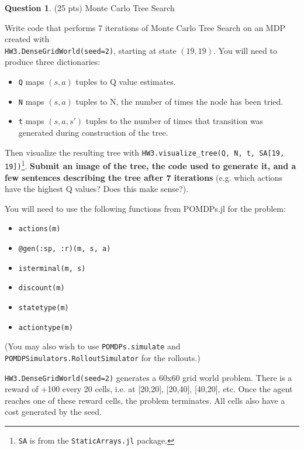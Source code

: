 \documentclass{article}
\theoremstyle{definition}
\newtheorem{question}[thm]{Question}
\begin{document}
\begin{question}\label{q:mcts}
    (25 pts) Monte Carlo Tree Search
    
    Write code that performs 7 iterations of Monte Carlo Tree Search on an MDP created with \\
    \texttt{HW3.DenseGridWorld(seed=2)},
    starting at state $(19, 19)$. You will need to produce three dictionaries:
    \begin{itemize}[noitemsep]
        \item \texttt{Q} maps $(s, a)$ tuples to Q value estimates.
        \item \texttt{N} maps $(s, a)$ tuples to N, the number of times the node has been tried.
        \item \texttt{t} maps $(s, a, s')$ tuples to the number of times that transition was generated during construction of the tree.
    \end{itemize}
    Then visualize the resulting tree with \texttt{HW3.visualize\_tree(Q, N, t, SA[19, 19])}\footnote{\texttt{SA} is from the \texttt{StaticArrays.jl} package.}. \textbf{Submit an image of the tree, the code used to generate it, and a few sentences describing the tree after 7 iterations} (e.g. which actions have the highest Q values? Does this make sense?).
    
    You will need to use the following functions from POMDPs.jl for the problem:
    \begin{itemize}[noitemsep]
        \item \texttt{actions(m)}
        \item \texttt{@gen(:sp, :r)(m, s, a)}
        \item \texttt{isterminal(m, s)}
        \item \texttt{discount(m)}
        \item \texttt{statetype(m)}
        \item \texttt{actiontype(m)}
    \end{itemize}
    (You may also wish to use \texttt{POMDPs.simulate} and \texttt{POMDPSimulators.RolloutSimulator} for the rollouts.)

    \texttt{HW3.DenseGridWorld(seed=2)} generates a 60x60 grid world problem. There is a reward of +100 every 20 cells, i.e. at [20,20], [20,40], [40,20], etc. Once the agent reaches one of these reward cells, the problem terminates. All cells also have a cost generated by the seed.
\end{question}
\end{document}
